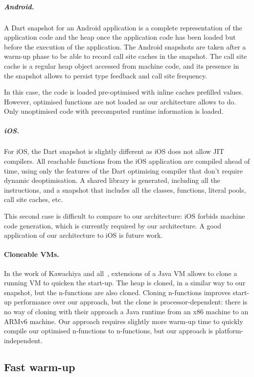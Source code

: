 \documentclass[a4paper,12pt,twoside]{../includes/ThesisStyle}
\begin{document}
\subparagraph{Android.} A Dart snapshot for an Android application is a complete representation of the application code and the heap once the application code has been loaded but before the execution of the application. The Android snapshots are taken after a warm-up phase to be able to record call site caches in the snapshot. The call site cache is a regular heap object accessed from machine code, and its presence in the snapshot allows to persist type feedback and call site frequency.

In this case, the code is loaded pre-optimised with inline caches prefilled values. However, optimised functions are not loaded as our architecture allows to do. Only unoptimised code with precomputed runtime information is loaded.

\subparagraph{iOS.} For iOS, the Dart snapshot is slightly different as iOS does not allow JIT compilers. All reachable functions from the iOS application are compiled ahead of time, using only the features of the Dart optimising compiler that don't require dynamic deoptimisation. A shared library is generated, including all the instructions, and a snapshot that includes all the classes, functions, literal pools, call site caches, etc.

This second case is difficult to compare to our architecture: iOS forbids machine code generation, which is currently required by our architecture. A good application of our architecture to iOS is future work.

\paragraph{Cloneable VMs.}

In the work of Kawachiya and all~\cite{Kawa07a}, extensions of a Java VM allows to clone a running VM to quicken the start-up. The heap is cloned, in a similar way to our snapshot, but the n-functions are also cloned. Cloning n-functions improves start-up performance over our approach, but the clone is processor-dependent: there is no way of cloning with their approach a Java runtime from an x86 machine to an ARMv6 machine. Our approach requires slightly more warm-up time to quickly compile our optimised n-functions to n-functions, but our approach is platform-independent.

\subsection{Fast warm-up}
\end{document}
